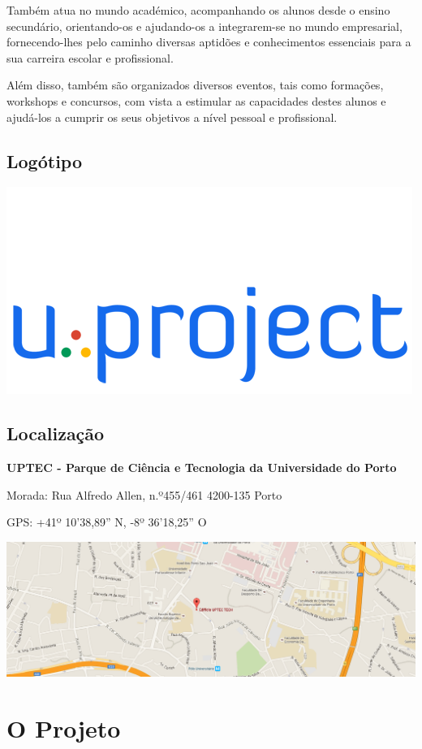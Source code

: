 \documentclass[11pt]{report}
\begin{document}
Também atua no mundo académico, acompanhando os alunos desde o ensino secundário, orientando-os e ajudando-os a integrarem-se no mundo empresarial, fornecendo-lhes pelo caminho diversas aptidões e conhecimentos essenciais para a sua carreira escolar e profissional. 

Além disso, também são organizados diversos eventos, tais como formações, workshops e concursos, com vista a estimular as capacidades destes alunos e ajudá-los a cumprir os seus objetivos a nível pessoal e profissional.
\section{Logótipo}
\begin{center}
\includegraphics [scale=0.5]{uplogo500.png}
\label{img1}
\end{center}
\section{Localização}
\textbf{UPTEC - Parque de Ciência e Tecnologia da Universidade do Porto} 


Morada:
Rua Alfredo Allen, n.º455/461
4200-135 Porto


GPS:
+41º 10'38,89'' N, -8º 36'18,25'' O


\includegraphics [scale=0.35]{location.png}
\label{img2}
\newpage

\chapter{O Projeto}
\end{document}
